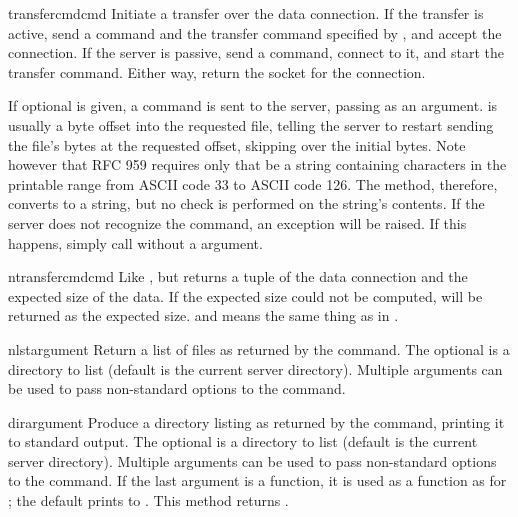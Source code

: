 \begin{methoddesc}{transfercmd}{cmd}
Initiate a transfer over the data connection.  If the transfer is
active, send a  command and the transfer command specified
by , and accept the connection.  If the server is passive,
send a  command, connect to it, and start the transfer
command.  Either way, return the socket for the connection.

If optional  is given, a  command is
sent to the server, passing  as an argument.   is
usually a byte offset into the requested file, telling the server to
restart sending the file's bytes at the requested offset, skipping
over the initial bytes.  Note however that RFC
959 requires only that  be a string containing characters
in the printable range from ASCII code 33 to ASCII code 126.  The
 method, therefore, converts
 to a string, but no check is
performed on the string's contents.  If the server does
not recognize the  command, an
 exception will be raised.  If this happens,
simply call  without a  argument.
\end{methoddesc}

\begin{methoddesc}{ntransfercmd}{cmd}
Like , but returns a tuple of the data
connection and the expected size of the data.  If the expected size
could not be computed,  will be returned as the expected
size.   and  means the same thing as in
.
\end{methoddesc}

\begin{methoddesc}{nlst}{argument\optional{, \ldots}}
Return a list of files as returned by the  command.  The
optional  is a directory to list (default is the current
server directory).  Multiple arguments can be used to pass
non-standard options to the  command.
\end{methoddesc}

\begin{methoddesc}{dir}{argument\optional{, \ldots}}
Produce a directory listing as returned by the  command,
printing it to standard output.  The optional  is a
directory to list (default is the current server directory).  Multiple
arguments can be used to pass non-standard options to the 
command.  If the last argument is a function, it is used as a
 function as for ; the default
prints to .  This method returns .
\end{methoddesc}

